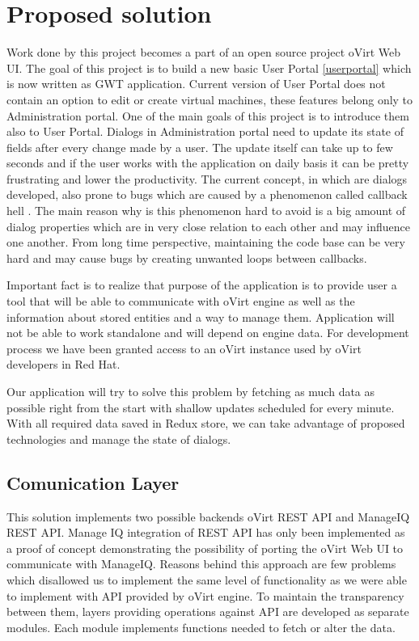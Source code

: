 \chapter{Proposed solution}
Work done by this project becomes a part of an open source project oVirt Web UI. The goal of this project is to build a new basic User Portal \ref{userportal} which is now written as GWT \cite{gwt} application.
Current version of User Portal does not contain an option to edit or create virtual machines, these features belong only to Administration portal. One of the main goals of this project is to introduce them also to User Portal.
Dialogs in Administration portal need to update its state of fields after every change made by a user. The update itself can take up to few seconds and if the user works with the application on daily basis it can be pretty frustrating and lower the productivity. 
The current concept, in which are dialogs developed, also prone to bugs which are caused by a phenomenon called callback hell \cite{callback_hell}. The main reason why is this phenomenon hard to avoid is a big amount of dialog properties which are in very close relation to each other and may influence one another. From long time perspective, maintaining the code base can be very hard and may cause bugs by creating unwanted loops between callbacks. 

Important fact is to realize that purpose of the application is to provide user a tool that will be able to communicate with oVirt engine as well as the information about stored entities and a way to manage them. Application will not be able to work standalone and will depend on engine data. For development process we have been granted access to an oVirt instance used by oVirt developers in Red Hat.  

Our application will try to solve this problem by fetching as much data as possible right from the start with shallow updates scheduled for every minute. With all required data saved in Redux store, we can take advantage of proposed technologies and manage the state of dialogs.

\section{Comunication Layer}
This solution implements two possible backends oVirt REST API and ManageIQ REST API. Manage IQ integration of REST API has only been implemented as a proof of concept demonstrating the possibility of porting the oVirt Web UI to communicate with ManageIQ. Reasons behind this approach are few problems which disallowed us to implement the same level of functionality as we were able to implement with API provided by oVirt engine. To maintain the transparency between them, layers providing operations against API are developed as separate modules. Each module implements functions needed to fetch or alter the data.

